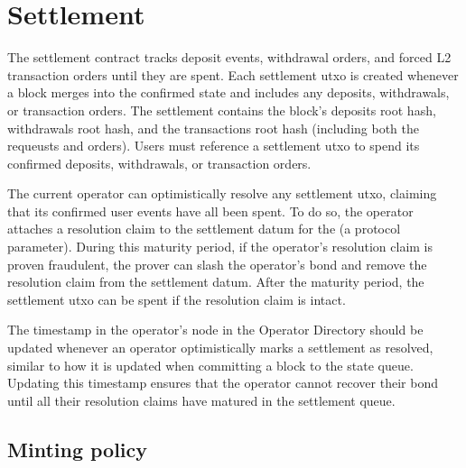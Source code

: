 \documentclass[../midgard.tex]{subfiles}
\begin{document}
\section{Settlement}
\label{h:settlement}

The settlement contract tracks deposit events, withdrawal orders, and forced L2 transaction orders until they are spent.
Each settlement utxo is created whenever a block merges into the confirmed state and includes any deposits, withdrawals, or transaction orders.
The settlement contains the block's deposits root hash, withdrawals root hash, and the transactions root hash (including both the requeusts and orders).
Users must reference a settlement utxo to spend its confirmed deposits, withdrawals, or transaction orders.

The current operator can optimistically resolve any settlement utxo, claiming that its confirmed user events have all been spent.
To do so, the operator attaches a resolution claim to the settlement datum for the  (a protocol parameter).
During this maturity period, if the operator's resolution claim is proven fraudulent, the prover can slash the operator's bond and remove the resolution claim from the settlement datum.
After the maturity period, the settlement utxo can be spent if the resolution claim is intact.


The timestamp in the operator's node in the Operator Directory should be updated whenever an operator optimistically marks a settlement as resolved, similar to how it is updated when committing a block to the state queue.
Updating this timestamp ensures that the operator cannot recover their bond until all their resolution claims have matured in the settlement queue.

\subsection{Minting policy}
\label{h:settlement-minting-policy}
\end{document}
